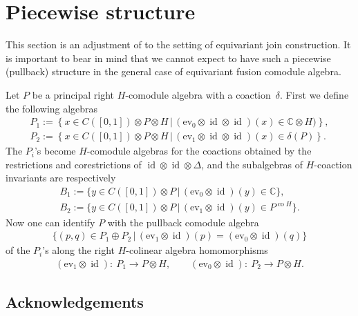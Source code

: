 \documentclass[pdftex]{sigma}
\numberwithin{equation}{section}
\begin{document}
\section{Piecewise structure}

This section is an adjustment of \cite[Section~5.1]{hkmz11} to the setting of  equivariant join construction.
It is important to bear in mind that we cannot expect to have such a piecewise (pullback) structure in the
general case of equivariant fusion comodule algebra.

Let $P$ be a principal right $H$-comodule algebra with a coaction~$\delta$.
First we def\/ine the following algebras
\begin{gather*}
  P_1:=\left\{x\in C([0,1]) \otimes P \otimes H \,
\big|\, (\mathrm{ev}_0\otimes \operatorname{id}\otimes \operatorname{id})(x) \in \mathbb{C}\otimes H) \right\},\nonumber\\
  P_2:=\left\{x\in C([0,1]) \otimes P \otimes H \,
\big|\, (\mathrm{ev}_1\otimes \operatorname{id}\otimes \operatorname{id})(x) \in \delta (P) \right\}.
\end{gather*}
The $P_i$'s become
$H$-comodule algebras for the coactions obtained by the restrictions and corestrictions of
\mbox{$\operatorname{id}\otimes \operatorname{id} \otimes \Delta$},
and the subalgebras of $H$-coaction invariants are respectively
\begin{gather*}
  B_1:=\{y \in C([0,1])\otimes P \,|\, (\mathrm{ev}_0\otimes \operatorname{id})(y) \in \mathbb{C}\},
		  \nonumber\\
  B_2:=\{y\in C([0,1])\otimes P \,|\, (\mathrm{ev}_1\otimes \operatorname{id})(y) \in P^{\operatorname{co}H}\}.
\end{gather*}
 Now one can identify $P$ with the pullback comodule algebra
\begin{gather*}
	\{(p,q) \in P_1 \oplus P_2\,|\,
	(\mathrm{ev}_1\otimes \operatorname{id})(p)=(\mathrm{ev}_0\otimes \operatorname{id})(q)\}
\end{gather*}
of the $P_i$'s along the right $H$-colinear algebra homomorphisms
\begin{gather*}
(\mathrm{ev}_1\otimes \operatorname{id})\colon \  P_1 \longrightarrow P\otimes H,\qquad
(\mathrm{ev}_0\otimes \operatorname{id})\colon \ P_2 \longrightarrow P\otimes H.
\end{gather*}

\subsection*{Acknowledgements}
\end{document}
